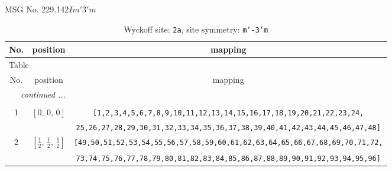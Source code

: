 \documentclass[fleqn,8pt]{jsarticle}
\begin{document}
\setcounter{MaxMatrixCols}{32}

\renewcommand{\tablename}{Table~}
\renewcommand{\figurename}{Figure~}
\begin{center}
\LARGE
MSG No. 229.142\quad$Im'\bar{3}'m$
\end{center}
\renewcommand{\arraystretch}{1.2}
\begin{longtable}{ccc}
\caption{Wyckoff site: {\tt 2a}, site symmetry: {\tt m'-3'm}}
 \\
 \hline \hline
No. & position & mapping \\ \hline \endfirsthead

\multicolumn{2}{l}{\tablename\ \thetable{}} \\
 \hline \hline
No. & position & mapping \\ \hline \endhead

 \hline \hline
\multicolumn{2}{r}{\footnotesize\it continued ...} \\ \endfoot

 \hline \hline
\multicolumn{2}{r}{} \\ \endlastfoot

1 & $\left[ 0,\, 0,\, 0 \right]$ & {\tt [1,2,3,4,5,6,7,8,9,10,11,12,13,14,15,16,17,18,19,20,21,22,23,24,} \\ \hline
 &  & {\tt 25,26,27,28,29,30,31,32,33,34,35,36,37,38,39,40,41,42,43,44,45,46,47,48]} \\ \hline
2 & $\left[ \frac{1}{2},\, \frac{1}{2},\, \frac{1}{2} \right]$ & {\tt [49,50,51,52,53,54,55,56,57,58,59,60,61,62,63,64,65,66,67,68,69,70,71,72,} \\ \hline
 &  & {\tt 73,74,75,76,77,78,79,80,81,82,83,84,85,86,87,88,89,90,91,92,93,94,95,96]} \\
\end{longtable}
\renewcommand{\arraystretch}{1.2}
\end{document}
